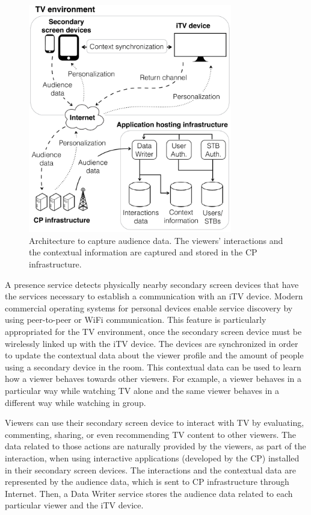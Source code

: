 \documentclass[journal]{IEEEtran}
\begin{document}
\begin{figure}[!t]
	\centering
	\includegraphics[width=3.5in]{img/architecture.pdf}
	\caption{Architecture to capture audience data. The viewers' interactions and the contextual information are captured and stored in the CP infrastructure.}
	\label{fig_architecture}
\end{figure}

A presence service detects physically nearby secondary screen devices that have the services necessary to establish a communication with an iTV device. Modern commercial operating systems for personal devices enable service discovery by using peer-to-peer or WiFi communication. This feature is particularly appropriated for the TV environment, once the secondary screen device must be wirelessly linked up with the iTV device. The devices are synchronized in order to update the contextual data about the viewer profile and the amount of people using a secondary device in the room. This contextual data can be used to learn how a viewer behaves towards other viewers. For example, a viewer behaves in a particular way while watching TV alone and the same viewer behaves in a different way while watching in group.

Viewers can use their secondary screen device to interact with TV by evaluating, commenting, sharing, or even recommending TV content to other viewers. The data related to those actions are naturally provided by the viewers, as part of the interaction, when using interactive applications (developed by the CP) installed in their secondary screen devices. The interactions and the contextual data are represented by the audience data, which is sent to CP infrastructure through Internet. Then, a Data Writer service stores the audience data related to each particular viewer and the iTV device.
\end{document}
